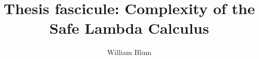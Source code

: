 

\author{William Blum}
\title{Thesis fascicule: Complexity of the Safe Lambda Calculus}


    \maketitle
    \tableofcontents

    

    
    

 